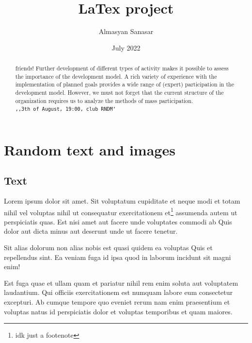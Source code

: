 \documentclass[10pt,a4paper]{report}
\title{LaTex project}
\author{Almasyan Sanasar}
\date{July 2022}
\begin{document}
\maketitle

\begin{abstract}
\textsf{friends! Further development of different types of activity makes it possible to assess the importance of the development model. A rich variety of experience with the implementation of planned goals provides a wide range of (expert) participation in the development model. However, we must not forget that the current structure of the organization requires us to analyze the methods of mass participation.
\\\texttt{,,3th of August, 19:00, club RNDM`} }
\end{abstract}

\tableofcontents
\chapter{Random text and images}
\section{Text}
Lorem ipsum dolor sit amet. Sit voluptatum cupiditate et neque modi et totam nihil vel voluptas nihil ut consequatur exercitationem et\footnote{idk just a footenote} assumenda autem ut perspiciatis quas. Est nisi amet aut facere unde voluptates commodi ab Quis dolor aut dicta minus aut deserunt unde ut facere tenetur.\cite{chen2001one}

Sit alias dolorum non alias nobis est quasi quidem ea voluptas Quis et repellendus sint. Ea veniam fuga id ipsa quod in laborum incidunt sit magni enim!

Est fuga quae et ullam quam et pariatur nihil rem enim soluta aut voluptatem laudantium. Qui officiis exercitationem est numquam labore eum consectetur excepturi. Ab cumque tempore quo eveniet rerum nam enim praesentium et voluptas natus id perspiciatis dolor et voluptas temporibus et quam maiores.\cite{cherkassky2004practical}
\begin{figure}
    \centering
    \begin{subfigure}{0.3\textwidth}
    \label{fig:sub1}
    \end{subfigure}
    \begin{subfigure}{0.3\textwidth}
    \label{fig:sub2}
    \end{subfigure}
    \begin{subfigure}{0.3\textwidth}
    \label{fig:sub3}
    \end{subfigure}
\end{figure}
\clearpage
\end{document}
